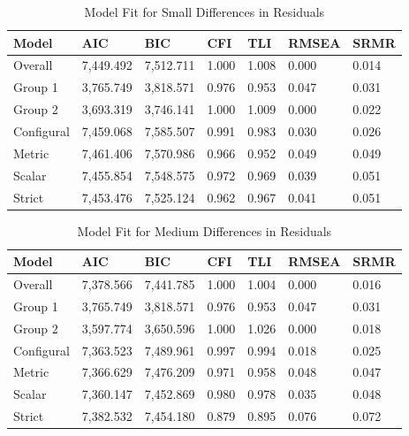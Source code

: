 \documentclass[
  man]{apa7}
\begin{document}
\begin{table}[tbp]

\begin{center}
\begin{threeparttable}

\caption{\label{tab:tab8}Model Fit for Small Differences in Residuals}

\begin{tabular}{lllllll}
\toprule
Model & AIC & BIC & CFI & TLI & RMSEA & SRMR\\
\midrule
Overall & 7,449.492 & 7,512.711 & 1.000 & 1.008 & 0.000 & 0.014\\
Group 1 & 3,765.749 & 3,818.571 & 0.976 & 0.953 & 0.047 & 0.031\\
Group 2 & 3,693.319 & 3,746.141 & 1.000 & 1.009 & 0.000 & 0.022\\
Configural & 7,459.068 & 7,585.507 & 0.991 & 0.983 & 0.030 & 0.026\\
Metric & 7,461.406 & 7,570.986 & 0.966 & 0.952 & 0.049 & 0.049\\
Scalar & 7,455.854 & 7,548.575 & 0.972 & 0.969 & 0.039 & 0.051\\
Strict & 7,453.476 & 7,525.124 & 0.962 & 0.967 & 0.041 & 0.051\\
\bottomrule
\end{tabular}

\end{threeparttable}
\end{center}

\end{table}

\begin{table}[tbp]

\begin{center}
\begin{threeparttable}

\caption{\label{tab:tab9}Model Fit for Medium Differences in Residuals}

\begin{tabular}{lllllll}
\toprule
Model & AIC & BIC & CFI & TLI & RMSEA & SRMR\\
\midrule
Overall & 7,378.566 & 7,441.785 & 1.000 & 1.004 & 0.000 & 0.016\\
Group 1 & 3,765.749 & 3,818.571 & 0.976 & 0.953 & 0.047 & 0.031\\
Group 2 & 3,597.774 & 3,650.596 & 1.000 & 1.026 & 0.000 & 0.018\\
Configural & 7,363.523 & 7,489.961 & 0.997 & 0.994 & 0.018 & 0.025\\
Metric & 7,366.629 & 7,476.209 & 0.971 & 0.958 & 0.048 & 0.047\\
Scalar & 7,360.147 & 7,452.869 & 0.980 & 0.978 & 0.035 & 0.048\\
Strict & 7,382.532 & 7,454.180 & 0.879 & 0.895 & 0.076 & 0.072\\
\bottomrule
\end{tabular}

\end{threeparttable}
\end{center}

\end{table}
\end{document}
